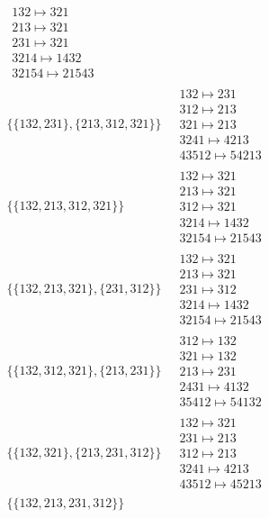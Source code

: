 \begin{scriptsize}
\begin{align}
\begin{matrix}
132 \mapsto 321
\\
213 \mapsto 321
\\
231 \mapsto 321
\\
3214 \mapsto 1432
\\
32154 \mapsto 21543
\end{matrix}
\\
\{\{132, 231\}, \{213, 312, 321\}\}
\ 
&
\begin{matrix}
132 \mapsto 231
\\
312 \mapsto 213
\\
321 \mapsto 213
\\
3241 \mapsto 4213
\\
43512 \mapsto 54213
\end{matrix}
\\
\{\{132, 213, 312, 321\}\}
\ 
&
\begin{matrix}
132 \mapsto 321
\\
213 \mapsto 321
\\
312 \mapsto 321
\\
3214 \mapsto 1432
\\
32154 \mapsto 21543
\end{matrix}
\\
\{\{132, 213, 321\}, \{231, 312\}\}
\ 
&
\begin{matrix}
132 \mapsto 321
\\
213 \mapsto 321
\\
231 \mapsto 312
\\
3214 \mapsto 1432
\\
32154 \mapsto 21543
\end{matrix}
\\
\{\{132, 312, 321\}, \{213, 231\}\}
\ 
&
\begin{matrix}
312 \mapsto 132
\\
321 \mapsto 132
\\
213 \mapsto 231
\\
2431 \mapsto 4132
\\
35412 \mapsto 54132
\end{matrix}
\\
\{\{132, 321\}, \{213, 231, 312\}\}
\ 
&
\begin{matrix}
132 \mapsto 321
\\
231 \mapsto 213
\\
312 \mapsto 213
\\
3241 \mapsto 4213
\\
43512 \mapsto 45213
\end{matrix}
\\
\{\{132, 213, 231, 312\}\}

\end{align}
\end{scriptsize}
